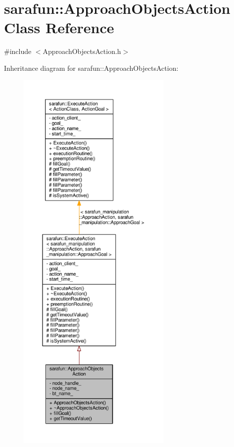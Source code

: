 \hypertarget{classsarafun_1_1ApproachObjectsAction}{\section{sarafun\-:\-:Approach\-Objects\-Action Class Reference}
\label{classsarafun_1_1ApproachObjectsAction}
}


{\ttfamily \#include $<$Approach\-Objects\-Action.\-h$>$}



Inheritance diagram for sarafun\-:\-:Approach\-Objects\-Action\-:
\nopagebreak
\begin{figure}[H]
\begin{center}
\leavevmode
\includegraphics[height=550pt]{d0/d16/classsarafun_1_1ApproachObjectsAction__inherit__graph}
\end{center}
\end{figure}


